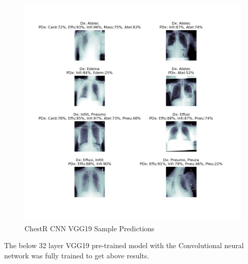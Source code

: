 \documentclass{article}
\begin{document}
    \begin{figure}
        \includegraphics[width=\linewidth]{./images/chestr-vgg19_sample-images-pred-view.jpg}
        \caption{ChestR CNN VGG19 Sample Predictions}
        \label{fig:cnn-vgg19-samples}
    \end{figure}

    The below 32 layer VGG19 pre-trained model with the Convolutional neural network was fully trained to get above results.
\end{document}
